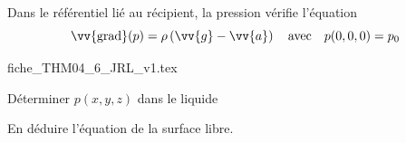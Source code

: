 Dans le référentiel lié au récipient, la pression vérifie l'équation  
$$
\vv{\text{grad}}(p)=\rho \left(\vv{g}-\vv{a}\right)
\quad
\text{avec}
\quad
p(0,0,0)=p_0
$$ 


                                \initialisationPartieDroite %
\begin{center}
{fiche_THM04_6_JRL_v1.tex}
\end{center}
                               \finalisationDuPartageDePage %



\debutEntrainement




\begin{enonce}
Déterminer $p(x,y,z)$ dans le liquide
\end{enonce}





\begin{enonce}
En déduire l'équation de la surface libre.
\end{enonce}




